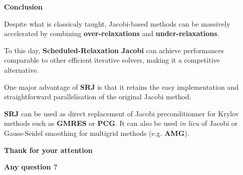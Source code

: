 \documentclass[aspectratio=169]{beamer}
\begin{document}
{
  \begin{frame}[fragile]{}{}
    \vfill
    \centering
    \huge
    \textbf{\color{black} Conclusion}
    \vfill
  \end{frame}
}

\begin{frame}
  Despite what is classicaly taught, Jacobi-based methods can be massively accelerated by combining \textbf{over-relaxations} and \textbf{under-relaxations}.
  
  \pause
  
  \bigskip
  
  To this day, \textbf{Scheduled-Relaxation Jacobi} can achieve performances comparable to other efficient iterative solvers, making it a competitive alternative.
  
  \pause
  
  \bigskip
  
  One major advantage of \textbf{SRJ} is that it retains the easy implementation and straightforward parallelisation of the original Jacobi method.
  
  \vspace{-1cm}
\end{frame}

\begin{frame}
  \textbf{SRJ} can be used as direct replacement of Jacobi preconditionner for Krylov methods such as \textbf{GMRES} or \textbf{PCG}.
  It can also be used \emph{in lieu} of Jacobi or Gauss-Seidel smoothing for multigrid methods (e.g. \textbf{AMG}).

  \vspace{-1cm}
\end{frame}


{
  \begin{frame}[fragile]{}{}
    \vfill
    \flushright
    \Large
    \textbf{\color{black} Thank for your attention}

    \large
    \textbf{\color{gray} Any question ?}
    \vfill
  \end{frame}
}
\end{document}
